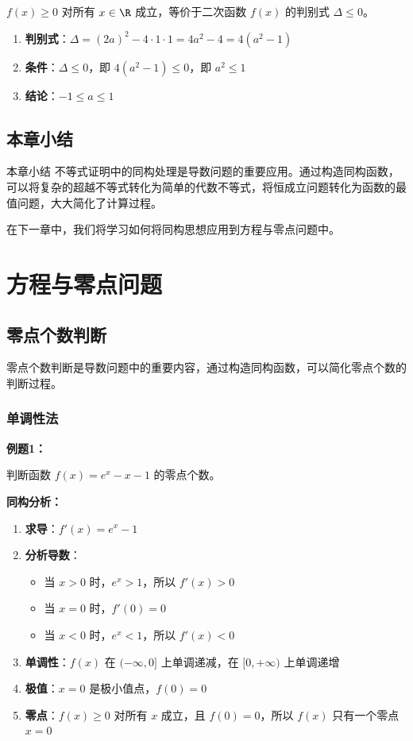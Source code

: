 \documentclass[a4paper,11pt]{ctexrep}
\newcommand{\exampleicon}{\ModeBadge[highlight]{例题}}
\newcommand{\analysisicon}{\ModeBadge[secondary]{分析}}
\theoremstyle{definition}
\begin{document}
$f(x) \geq 0$ 对所有 $x \in \R$ 成立，等价于二次函数 $f(x)$ 的判别式 $\Delta \leq 0$。

\begin{enumerate}
    \item \textbf{判别式}：$\Delta = (2a)^2 - 4 \cdot 1 \cdot 1 = 4a^2 - 4 = 4(a^2 - 1)$
    \item \textbf{条件}：$\Delta \leq 0$，即 $4(a^2 - 1) \leq 0$，即 $a^2 \leq 1$
    \item \textbf{结论}：$-1 \leq a \leq 1$
\end{enumerate}

\section{本章小结}

\begin{summarybox}{本章小结}
不等式证明中的同构处理是导数问题的重要应用。通过构造同构函数，可以将复杂的超越不等式转化为简单的代数不等式，将恒成立问题转化为函数的最值问题，大大简化了计算过程。

在下一章中，我们将学习如何将同构思想应用到方程与零点问题中。
\end{summarybox}

\chapter{方程与零点问题}

\section{零点个数判断}

零点个数判断是导数问题中的重要内容，通过构造同构函数，可以简化零点个数的判断过程。

\subsection{单调性法}

\exampleicon \textbf{例题1：}

判断函数 $f(x) = e^x - x - 1$ 的零点个数。

\analysisicon \textbf{同构分析：}

\begin{enumerate}
    \item \textbf{求导}：$f'(x) = e^x - 1$
    \item \textbf{分析导数}：
    \begin{itemize}
        \item 当 $x > 0$ 时，$e^x > 1$，所以 $f'(x) > 0$
        \item 当 $x = 0$ 时，$f'(0) = 0$
        \item 当 $x < 0$ 时，$e^x < 1$，所以 $f'(x) < 0$
    \end{itemize}
    \item \textbf{单调性}：$f(x)$ 在 $(-\infty, 0]$ 上单调递减，在 $[0, +\infty)$ 上单调递增
    \item \textbf{极值}：$x = 0$ 是极小值点，$f(0) = 0$
    \item \textbf{零点}：$f(x) \geq 0$ 对所有 $x$ 成立，且 $f(0) = 0$，所以 $f(x)$ 只有一个零点 $x = 0$
\end{enumerate}
\end{document}

